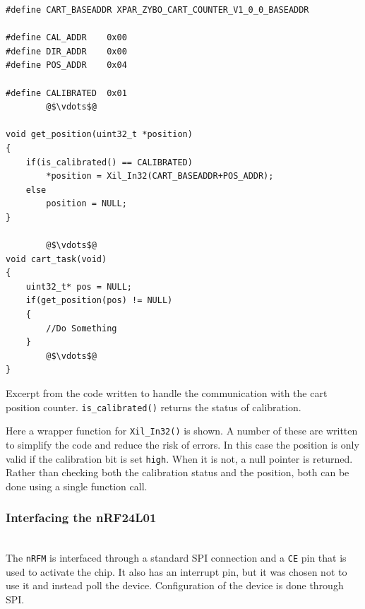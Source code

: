\begin{listing}[H]
\begin{verbatim}
#define CART_BASEADDR XPAR_ZYBO_CART_COUNTER_V1_0_0_BASEADDR

#define CAL_ADDR    0x00
#define DIR_ADDR    0x00
#define POS_ADDR    0x04
	
#define CALIBRATED  0x01
		@$\vdots$@
	
void get_position(uint32_t *position)
{
	if(is_calibrated() == CALIBRATED)
		*position = Xil_In32(CART_BASEADDR+POS_ADDR);
	else
		position = NULL;
}

		@$\vdots$@
void cart_task(void)
{
	uint32_t* pos = NULL;
	if(get_position(pos) != NULL)
	{
		//Do Something
	}
		@$\vdots$@
}
\end{verbatim}
\caption[Code handling communication with the cart position counter.]{Excerpt from the code written to handle the communication with the cart position counter. \texttt{is\_calibrated()} returns the status of calibration.}
\label{code:axiconnectionps}
\end{listing}

Here a wrapper function for \texttt{Xil\_In32()} is shown.
A number of these are written to simplify the code and reduce the risk of errors.
In this case the position is only valid if the calibration bit is set \texttt{high}.
When it is not, a null pointer is returned.
Rather than checking both the calibration status and the position, both can be done using a single function call.

\subsubsection{Interfacing the nRF24L01} %
\label{ssubs:nrf24l01}
~\\
The \texttt{nRFM} is interfaced through a standard SPI connection and a \texttt{CE} pin that is used to activate the chip. 
It also has an interrupt pin, but it was chosen not to use it and instead poll the device. 
Configuration of the device is done through SPI.

